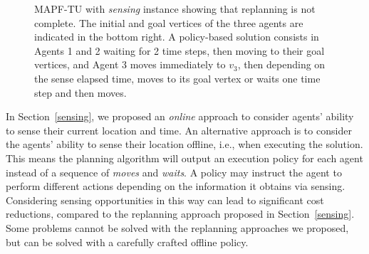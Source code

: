 \documentclass[jair,twoside,11pt,theapa]{article}
\newcommand{\tuple}[1]{\langle#1\rangle}
\newcommand{\sourcetargets}{\mathcal{S}}
\begin{document}
\begin{figure}[ht]
\centering
{}
\caption{MAPF-TU with \emph{sensing} instance showing that replanning is not complete.
The initial and goal vertices of the three agents are indicated in the bottom right.
A policy-based solution consists in Agents 1 and 2 waiting for 2 time steps, then moving to their goal vertices, and Agent 3 moves immediately to $v_3$, then depending on the sense elapsed time, moves to its goal vertex or waits one time step and then moves.
}
\label{fig:replanning-incomplete}
\end{figure}


In Section~\ref{sensing}, we proposed an \emph{online} approach to consider agents' ability to sense their current location and time. 
An alternative approach is to consider the agents' ability to sense their location offline, i.e., when executing the solution. 
This means the planning algorithm will output an execution policy for each agent instead of a sequence of \emph{moves} and \emph{waits}. 
A policy may instruct the agent to perform different actions depending on the information it obtains via sensing. 
%
Considering sensing opportunities in this way can lead to significant cost reductions, compared to the replanning approach proposed in Section~\ref{sensing}. Some problems cannot be solved with the replanning approaches we proposed, but can be solved with a carefully crafted offline policy. 
\end{document}
